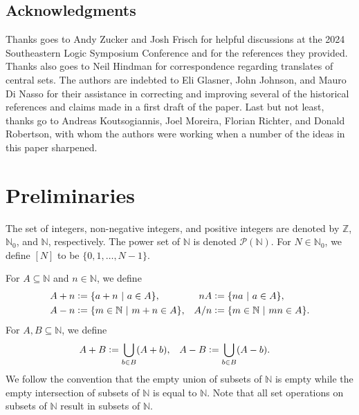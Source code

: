 \documentclass[letter,11pt]{article}
\theoremstyle{plain}
\theoremstyle{definition}
\theoremstyle{plain}
\theoremstyle{plain}
\numberwithin{equation}{section}
\newcommand{\N}{\mathbb{N}}
\newcommand{\Z}{\mathbb{Z}}
\newcommand{\defeq}{\vcentcolon=}
\begin{document}
\begin{figure}[omitted: a diagram of this paper's results, not reproduced here]\label{fig_main_results}\end{figure}




\subsection{Acknowledgments}

Thanks goes to Andy Zucker and Josh Frisch for helpful discussions at the 2024 Southeastern Logic Symposium Conference and for the references they provided.  Thanks also goes to Neil Hindman for correspondence regarding translates of central sets.  The authors are indebted to Eli Glasner, John Johnson, and Mauro Di Nasso for their assistance in correcting and improving several of the historical references and claims made in a first draft of the paper. Last but not least, thanks go to Andreas Koutsogiannis, Joel Moreira, Florian Richter, and Donald Robertson, with whom the authors were working when a number of the ideas in this paper sharpened. 

\section{Preliminaries}
\label{sec_prelims}


The set of integers, non-negative integers, and positive integers are denoted by $\Z$, $\N_0$, and $\N$, respectively.  The power set of $\N$ is denoted $\mathcal{P}(\N)$.  For $N \in \N_0$, we define $[N]$ to be $\{0, 1, \ldots, N - 1\}$.

For $A \subseteq \N$ and $n \in \N$, we define
\begin{align*}
    A+n &\defeq \{a + n \ | \ a \in A \}, & nA & \defeq \{ na \ | \ a \in A\}, \\
    A-n &\defeq \{m \in \N \ | \ m + n \in A \}, & A/n & \defeq \{ m \in \N \ | \ mn \in A\}.
\end{align*}
For $A, B \subseteq \N$, we define
\begin{align*}
    A+B &\defeq \bigcup_{b \in B} (A + b), & A-B &\defeq \bigcup_{b \in B} (A-b).
\end{align*}
We follow the convention that the empty union of subsets of $\N$ is empty while the empty intersection of subsets of $\N$ is equal to $\N$. Note that all set operations on subsets of $\N$ result in subsets of $\N$.
\end{document}
